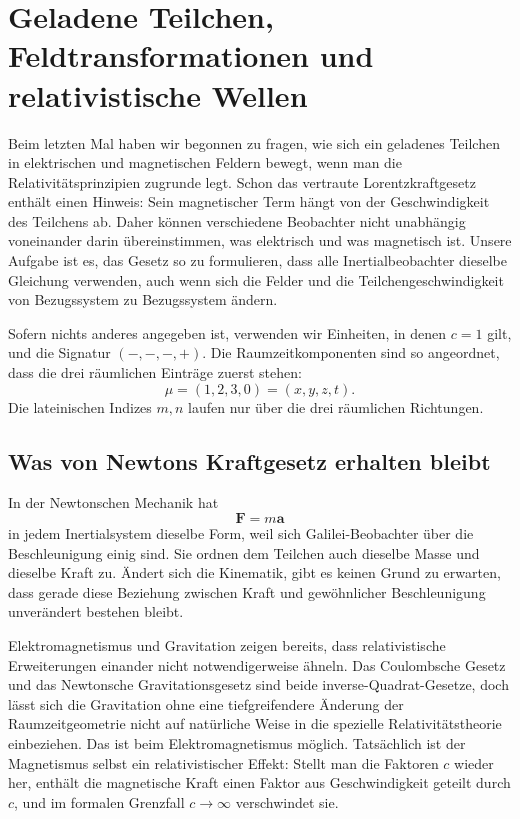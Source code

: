 \chapter{Geladene Teilchen, Feldtransformationen und relativistische Wellen}

Beim letzten Mal haben wir begonnen zu fragen, wie sich ein geladenes Teilchen in elektrischen und magnetischen Feldern bewegt, wenn man die Relativitätsprinzipien zugrunde legt. Schon das vertraute Lorentzkraftgesetz enthält einen Hinweis: Sein magnetischer Term hängt von der Geschwindigkeit des Teilchens ab. Daher können verschiedene Beobachter nicht unabhängig voneinander darin übereinstimmen, was elektrisch und was magnetisch ist. Unsere Aufgabe ist es, das Gesetz so zu formulieren, dass alle Inertialbeobachter dieselbe Gleichung verwenden, auch wenn sich die Felder und die Teilchengeschwindigkeit von Bezugssystem zu Bezugssystem ändern.

Sofern nichts anderes angegeben ist, verwenden wir Einheiten, in denen \(c=1\) gilt, und die Signatur \((-,-,-,+)\). Die Raumzeitkomponenten sind so angeordnet, dass die drei räumlichen Einträge zuerst stehen: \begin{equation}
  \mu=(1,2,3,0)=(x,y,z,t).
\end{equation} Die lateinischen Indizes \(m,n\) laufen nur über die drei räumlichen Richtungen.

\section{Was von Newtons Kraftgesetz erhalten bleibt}

In der Newtonschen Mechanik hat \begin{equation}
  \boldsymbol F=m\boldsymbol a
\end{equation} in jedem Inertialsystem dieselbe Form, weil sich Galilei-Beobachter über die Beschleunigung einig sind. Sie ordnen dem Teilchen auch dieselbe Masse und dieselbe Kraft zu. Ändert sich die Kinematik, gibt es keinen Grund zu erwarten, dass gerade diese Beziehung zwischen Kraft und gewöhnlicher Beschleunigung unverändert bestehen bleibt.

Elektromagnetismus und Gravitation zeigen bereits, dass relativistische Erweiterungen einander nicht notwendigerweise ähneln. Das Coulombsche Gesetz und das Newtonsche Gravitationsgesetz sind beide inverse-Quadrat-Gesetze, doch lässt sich die Gravitation ohne eine tiefgreifendere Änderung der Raumzeitgeometrie nicht auf natürliche Weise in die spezielle Relativitätstheorie einbeziehen. Das ist beim Elektromagnetismus möglich. Tatsächlich ist der Magnetismus selbst ein relativistischer Effekt: Stellt man die Faktoren \(c\) wieder her, enthält die magnetische Kraft einen Faktor aus Geschwindigkeit geteilt durch \(c\), und im formalen Grenzfall \(c\to\infty\) verschwindet sie.


